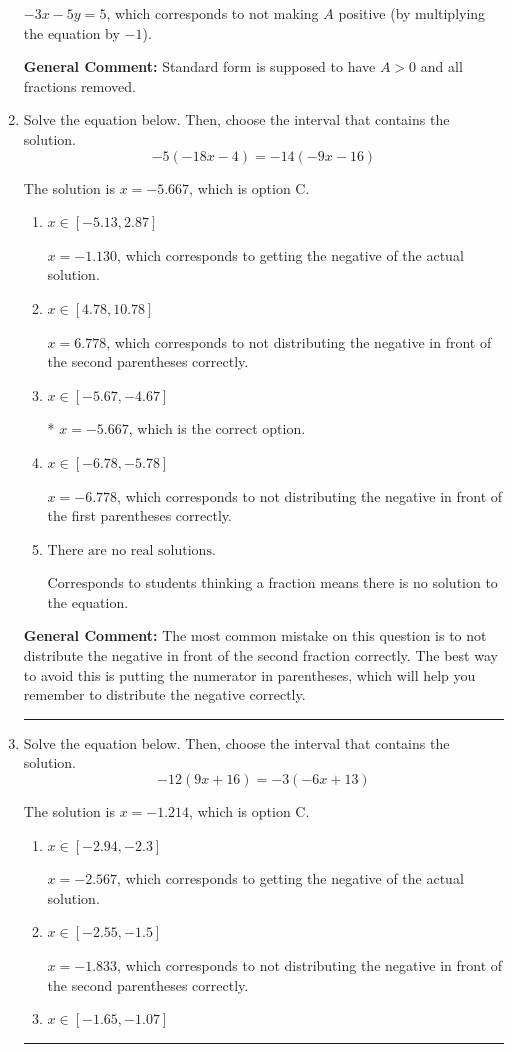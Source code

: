 \documentclass{extbook}[14pt]
\newcommand{\litem}[1]{\item #1

\rule{\textwidth}{0.4pt}}
\begin{document}
\begin{enumerate}
{\begin{enumerate}[label=\Alph*.]
 $-3x - 5y = 5$, which corresponds to not making $A$ positive (by multiplying the equation by $-1$).
\end{enumerate}

\textbf{General Comment:} Standard form is supposed to have $A > 0$ and all fractions removed.
}
\litem{
Solve the equation below. Then, choose the interval that contains the solution.
\[ -5(-18x -4) = -14(-9x -16) \]

The solution is \( x = -5.667 \), which is option C.\begin{enumerate}[label=\Alph*.]
\item \( x \in [-5.13, 2.87] \)

$x = -1.130$, which corresponds to getting the negative of the actual solution.
\item \( x \in [4.78, 10.78] \)

$x = 6.778$, which corresponds to not distributing the negative in front of the second parentheses correctly.
\item \( x \in [-5.67, -4.67] \)

* $x = -5.667$, which is the correct option.
\item \( x \in [-6.78, -5.78] \)

$x = -6.778$, which corresponds to not distributing the negative in front of the first parentheses correctly.
\item \( \text{There are no real solutions.} \)

Corresponds to students thinking a fraction means there is no solution to the equation.
\end{enumerate}

\textbf{General Comment:} The most common mistake on this question is to not distribute the negative in front of the second fraction correctly. The best way to avoid this is putting the numerator in parentheses, which will help you remember to distribute the negative correctly.
}
\litem{
Solve the equation below. Then, choose the interval that contains the solution.
\[ -12(9x + 16) = -3(-6x + 13) \]

The solution is \( x = -1.214 \), which is option C.\begin{enumerate}[label=\Alph*.]
\item \( x \in [-2.94, -2.3] \)

$x = -2.567$, which corresponds to getting the negative of the actual solution.
\item \( x \in [-2.55, -1.5] \)

$x = -1.833$, which corresponds to not distributing the negative in front of the second parentheses correctly.
\item \( x \in [-1.65, -1.07] \)


\end{enumerate}}
\end{enumerate}
\end{document}
